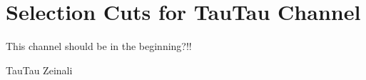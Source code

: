 \section{Selection Cuts for TauTau Channel}
\label{sect:tauTauCuts}
This channel should be in the beginning?!!

TauTau 
Zeinali

